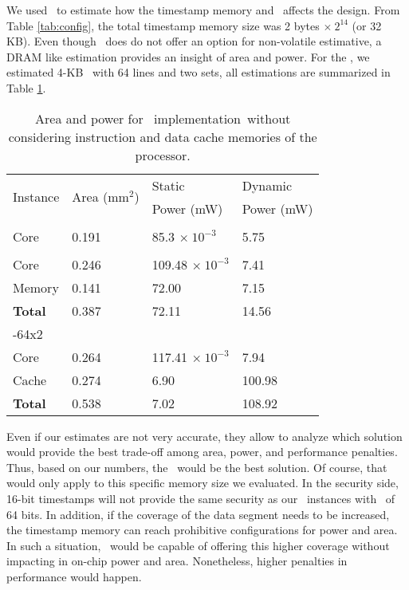 We used \cacti~to estimate how the timestamp memory and \ptagcache~affects the design. From Table \ref{tab:config}, the total timestamp memory size was 2 bytes $\times~2^{14}$ (or 32 KB). Even though \cacti~does do not offer an option for non-volatile estimative, a DRAM like estimation provides an insight of area and power. For the \ptagcache, we estimated 4-KB \ptagcache~with 64 lines and two sets, all estimations are summarized in Table \ref{tab:area-power}. 

\begin{table}[t]
	\center
	\caption{Area and power for \cshia~implementation~without considering instruction and data cache memories of the processor.}
	\label{tab:area-power}
	\footnotesize
	\begin{tabular}{|l|l|p{0.65in}|p{0.6in}|}
		\hline
			\multirow{2}{*}{Instance} & \multirow{2}{*}{Area (mm$^{2}$)} & Static & Dynamic\\ 
			 & & Power (mW) & Power (mW)\\ 
		\hline
		\hline
			\baseline & & & \\
				\hspace{0.25in} Core & 0.191 & 85.3 $\times~10^{-3}$ & 5.75 \\
			\timestamp & & & \\
				\hspace{0.25in} Core & 0.246 & 109.48 $\times~10^{-3}$ & 7.41 \\
				\hspace{0.25in} Memory & 0.141 & 72.00 & 7.15  \\
				\hspace{0.25in} \textbf{Total} & 0.387 & 72.11 & 14.56  \\
			\cshiamt-64x2 & & & \\
				\hspace{0.25in} Core & 0.264 & 117.41 $\times~10^{-3}$ & 7.94 \\
				\hspace{0.25in} Cache & 0.274 & 6.90 & 100.98  \\
				\hspace{0.25in} \textbf{Total} & 0.538 & 7.02 & 108.92 \\
		\hline
	\end{tabular}
\end{table}

Even if our estimates are not very accurate, they allow to analyze which solution would provide the best trade-off among area, power, and performance penalties. Thus, based on our numbers, the \timestamp~would be the best solution. Of course, that would only apply to this specific memory size we evaluated. In the security side, 16-bit timestamps will not provide the same security as our \cshiamt~instances with \ptags~of 64 bits. In addition, if the coverage of the data segment needs to be increased, the timestamp memory can reach prohibitive configurations for power and area. In such a situation, \cshiamt~would be capable of offering this higher coverage without impacting in on-chip power and area. Nonetheless, higher penalties in performance would happen. 
